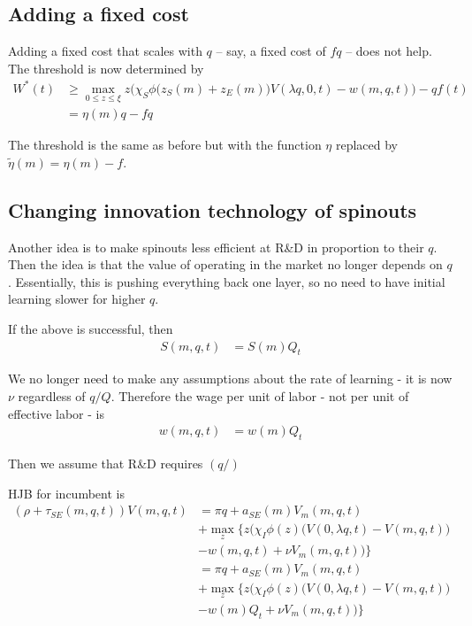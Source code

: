 \documentclass[12pt,english]{article}
\theoremstyle{remark}
\begin{document}
\subsection{Adding a fixed cost}

Adding a fixed cost that scales with $q$ -- say, a fixed cost of $fq$ -- does not help. The threshold is now determined by 
\begin{align*}
	W^*(t) &\ge \max_{0 \le z \le \xi} z \Big(\chi_S  \phi \big( z_S(m) + z_E(m)\big) V(\lambda q,0,t) - w(m,q,t) \Big) - qf(t) \\
		   &= \eta(m) q	- f q 
\end{align*} 

The threshold is the same as before but with the function $\eta$ replaced by $\tilde{\eta}(m) = \eta(m) - f$.

\subsection{Changing innovation technology of spinouts}

Another idea is to make spinouts less efficient at R\&D in proportion to their $q$. Then the idea is that the value of operating in the market no longer depends on $q$. Essentially, this is pushing everything back one layer, so no need to have initial learning slower for higher $q$.

If the above is successful, then 
\begin{align*}
	S(m,q,t) &= S(m) Q_t
\end{align*}

We no longer need to make any assumptions about the rate of learning - it is now $\nu$ regardless of $q/Q$. Therefore the wage per unit of labor - not per unit of effective labor - is
\begin{align*}
	w(m,q,t) &= w(m) Q_t
\end{align*}

Then we assume that R\&D requires $(q / )$

HJB for incumbent is
\begin{align*}
	(\rho + \tau_{SE}(m,q,t)) V(m,q,t) &= \pi q + a_{SE}(m) V_m(m,q,t) \\
	     &+ \max_z \Big\{ z \Big( \chi_I \phi(z) \big( V(0,\lambda q, t) - V(m,q,t) \big) \\
	     &- w(m,q,t) + \nu V_m (m,q,t)   \Big)     \Big\} \\
	     &= \pi q + a_{SE}(m) V_m(m,q,t) \\
	     &+ \max_z \Big\{ z \Big( \chi_I \phi(z) \big( V(0,\lambda q, t) - V(m,q,t) \big) \\
	     &- w(m)Q_t + \nu V_m (m,q,t) \Big) \Big\}
\end{align*}
\end{document}
